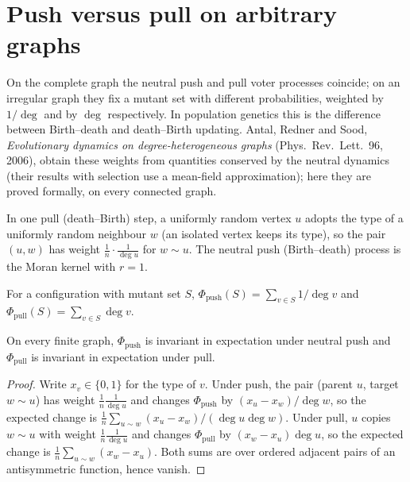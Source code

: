 \section{Push versus pull on arbitrary graphs}\label{sec:ars-push-pull}
On the complete graph the neutral push and pull voter processes coincide; on an irregular graph
they fix a mutant set with different probabilities, weighted by $1/\deg$ and by $\deg$
respectively. In population genetics this is the difference between Birth--death and
death--Birth updating. Antal, Redner and Sood, \emph{Evolutionary dynamics on
degree-heterogeneous graphs} (Phys.\ Rev.\ Lett.\ 96, 2006), obtain these weights from
quantities conserved by the neutral dynamics (their results with selection use a mean-field
approximation); here they are proved formally, on every connected graph.
\begin{definition}\label{def:pull}
\leanok{}
In one pull (death--Birth) step, a uniformly random vertex $u$ adopts the type of a uniformly
random neighbour $w$ (an isolated vertex keeps its type), so the pair $(u,w)$ has weight
$\frac1n\cdot\frac1{\deg u}$ for $w\sim u$. The neutral push (Birth--death) process is the
Moran kernel with $r=1$.
\end{definition}
\begin{definition}\label{def:repro}
\leanok
For a configuration with mutant set $S$, $\Phi_{\mathrm{push}}(S)=\sum_{v\in S}1/\deg v$ and
$\Phi_{\mathrm{pull}}(S)=\sum_{v\in S}\deg v$.
\end{definition}
\begin{theorem}\label{thm:pushpull-invariance}
\leanok{}
On every finite graph, $\Phi_{\mathrm{push}}$ is invariant in expectation under neutral push and
$\Phi_{\mathrm{pull}}$ is invariant in expectation under pull.
\end{theorem}
\begin{proof}\leanok
Write $x_v\in\{0,1\}$ for the type of $v$. Under push, the pair (parent $u$, target $w\sim u$)
has weight $\frac1n\frac1{\deg u}$ and changes $\Phi_{\mathrm{push}}$ by $(x_u-x_w)/\deg w$, so
the expected change is $\frac1n\sum_{u\sim w}(x_u-x_w)/(\deg u\deg w)$. Under pull, $u$ copies
$w\sim u$ with weight $\frac1n\frac1{\deg u}$ and changes $\Phi_{\mathrm{pull}}$ by
$(x_w-x_u)\deg u$, so the expected change is $\frac1n\sum_{u\sim w}(x_w-x_u)$. Both sums are
over ordered adjacent pairs of an antisymmetric function, hence vanish.
\end{proof}
